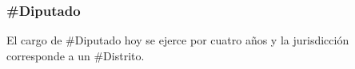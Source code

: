 \subsubsection{\#Diputado}

El cargo de \#Diputado hoy se ejerce por cuatro años y la jurisdicción
corresponde a un \#Distrito.

\begin{description}
  
\end{description}